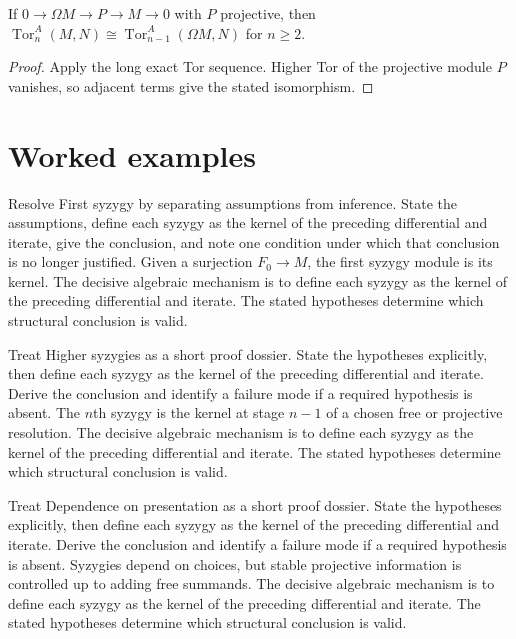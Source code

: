 \begin{theorem}\label{thm:v24-03}
If $0\to\Omega M\to P\to M\to0$ with $P$ projective, then $\operatorname{Tor}_{n}^A(M,N)\cong\operatorname{Tor}_{n-1}^A(\Omega M,N)$ for $n\ge2$.
\begin{proof}
Apply the long exact Tor sequence. Higher Tor of the projective module $P$ vanishes, so adjacent terms give the stated isomorphism.
\end{proof}
\end{theorem}

\section{Worked examples}

\begin{example}\label{ex:v24-worked-01}
Resolve First syzygy by separating assumptions from inference. State the assumptions, define each syzygy as the kernel of the preceding differential and iterate, give the conclusion, and note one condition under which that conclusion is no longer justified. Given a surjection $F_0\to M$, the first syzygy module is its kernel. The decisive algebraic mechanism is to define each syzygy as the kernel of the preceding differential and iterate. The stated hypotheses determine which structural conclusion is valid.
\end{example}

\begin{example}\label{ex:v24-worked-02}
Treat Higher syzygies as a short proof dossier. State the hypotheses explicitly, then define each syzygy as the kernel of the preceding differential and iterate. Derive the conclusion and identify a failure mode if a required hypothesis is absent. The $n$th syzygy is the kernel at stage $n-1$ of a chosen free or projective resolution. The decisive algebraic mechanism is to define each syzygy as the kernel of the preceding differential and iterate. The stated hypotheses determine which structural conclusion is valid.
\end{example}

\begin{example}\label{ex:v24-worked-03}
Treat Dependence on presentation as a short proof dossier. State the hypotheses explicitly, then define each syzygy as the kernel of the preceding differential and iterate. Derive the conclusion and identify a failure mode if a required hypothesis is absent. Syzygies depend on choices, but stable projective information is controlled up to adding free summands. The decisive algebraic mechanism is to define each syzygy as the kernel of the preceding differential and iterate. The stated hypotheses determine which structural conclusion is valid.
\end{example}

